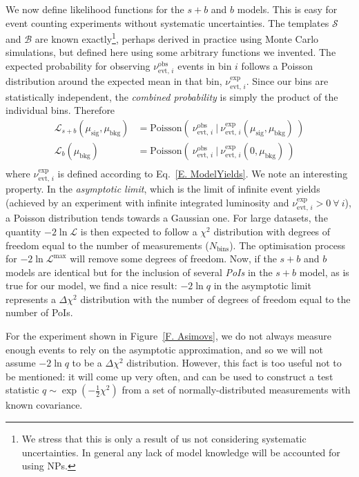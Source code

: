 We now define likelihood functions for the $s+b$ and $b$ models. This is easy for event counting experiments without systematic uncertainties. The templates $\mathcal{S}$ and $\mathcal{B}$ are known exactly\footnote{We stress that this is only a result of us not considering systematic uncertainties. In general any lack of model knowledge will be accounted for using NPs.}, perhaps derived in practice using Monte Carlo simulations, but defined here using some arbitrary functions we invented. The expected probability for observing $\nu^\text{obs}_{\text{evt, }i}$ events in bin $i$ follows a Poisson distribution around the expected mean in that bin, $\nu^\text{exp}_{\text{evt, }i}$. Since our bins are statistically independent, the \textit{combined probability} is simply the product of the individual bins. Therefore
\begin{equation}
\begin{aligned}
\mathcal{L}_{s+b} \left(\mu_\text{sig}, \mu_\text{bkg}\right) &=   \text{Poisson}\left( ~ \nu^\text{obs}_{\text{evt, }i}  ~|~  \nu^\text{exp}_{\text{evt, }i} \left(\mu_\text{sig}, \mu_\text{bkg} \right) ~ \right) \\
\mathcal{L}_{b} \left(\mu_\text{bkg}\right) &=   \text{Poisson}\left( ~ \nu^\text{obs}_{\text{evt, }i}  ~|~  \nu^\text{exp}_{\text{evt, }i} \left(0, \mu_\text{bkg} \right) ~ \right) \\
\end{aligned}
\end{equation}
where $\nu^\text{exp}_{\text{evt, }i}$ is defined according to Eq.~\ref{E. ModelYields}. We note an interesting property. In the \textit{asymptotic limit}, which is the limit of infinite event yields (achieved by an experiment with infinite integrated luminosity and $\nu^\text{exp}_{\text{evt, }i}>0 ~\forall~ i$), a Poisson distribution tends towards a Gaussian one. For large datasets, the quantity $-2 \ln \mathcal{L}$ is then expected to follow a $\chi^2$ distribution with degrees of freedom equal to the number of measurements ($N_\text{bins}$). The optimisation process for $-2 \ln \mathcal{L}^\text{max}$ will remove some degrees of freedom. Now, if the $s+b$ and $b$ models are identical but for the inclusion of several \textit{PoIs} in the $s+b$ model, as is true for our model, we find a nice result: $-2 \ln q$ in the asymptotic limit represents a $\Delta \chi^2$ distribution with the number of degrees of freedom equal to the number of PoIs.

For the experiment shown in Figure~\ref{F. Asimovs}, we do not always measure enough events to rely on the asymptotic approximation, and so we will not assume $-2 \ln q$ to be a $\Delta \chi^2$ distribution. However, this fact is too useful not to be mentioned: it will come up very often, and can be used to construct a test statistic $q\sim\exp\left(-\frac{1}{2} \chi^2\right)$ from a set of normally-distributed measurements with known covariance.






